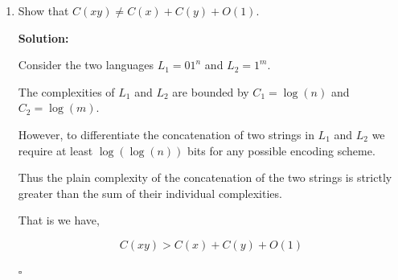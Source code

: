 \documentclass[10pt]{article}
\newenvironment{solution}{\textbf{Solution:}}{\hfill$\square$}
\begin{document}
\begin{enumerate}
\begin{solution}
On the other hand, since $y$ has a contiguous stretch of $\log_2 n$ or more zeroes, we have $K(y) \geq K(\text{stretch of zeroes}) + c$. Let $z$ be the shortest program that outputs the stretch of zeroes in $y$. Then, we have $K(y) \geq |z| + c$, where $|z|$ is at most $\log_2 n$. Therefore, we have $|z| + c \leq K(y) \leq |p_2| + c$.

This leads to a contradiction, since the length of the stretch of zeroes in $y$ is at least $\log_2 n$, which means that $|z| \geq \log_2 n$. Therefore, we have $\log_2 n + c \leq K(y) < O(n\log n)$, which implies that $n$ can be recovered from $y$ with high precision using a short program. This contradicts the assumption that more than half of the strings of length $n$ contain a contiguous stretch of $\log_2 n$ or more zeroes, since it implies that $n$ has low Kolmogorov complexity relative to the set of all strings of length $n$.

Therefore, we conclude that for all sufficiently large $n$, most strings of length $n$ will not have a contiguous stretch of more than $\log_2 n$ zeroes anywhere in the string, since otherwise it would lead to a contradiction with the definition of plain Kolmogorov complexity.


        
    \end{solution}
    \newpage

    \item  Show that $C(xy) \neq C(x) + C(y) + O(1)$.

    \begin{solution}

        Consider the two languages $L_1=01^n$ and $L_2=1^m$.
        
        The complexities of $L_1$ and $L_2$ are bounded by $C_1=\log(n)$ and $C_2=\log(m)$.

        However, to differentiate the concatenation of two strings in $L_1$ and $L_2$ we require at least $\log(\log(n))$ bits for any possible encoding scheme.

        Thus the plain complexity of the concatenation of the two strings is strictly greater than the sum of their individual complexities.

        That is we have,

        \[C(xy)>C(x)+C(y)+O(1)\]
        
    \end{solution}
    \newpage
    
\end{enumerate}
\end{document}
